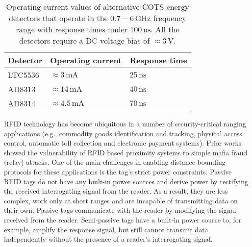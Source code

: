 \documentclass{sig-alternate-10pt}
\newcommand{\eg}{e.g.,\xspace}
\newcommand{\unit}[1]{\ensuremath{\, \mathrm{#1}}}
\begin{document}
\begin{table}
  \centering
  \begin{tabular}[h]{l|l|l}
  \hline
  \textbf{Detector}&\textbf{Operating current}&\textbf{Response time}\\
  \hline
  LTC5536 & $\approx 3\unit{mA}$& $25\unit{ns}$ \\
  AD8313 & $\approx 14\unit{mA}$& $40\unit{ns}$ \\
  AD8314 & $\approx 4.5\unit{mA}$& $70\unit{ns}$ \\
  \hline
  \end{tabular}
  \caption{Operating current values of alternative COTS energy detectors that
    operate in the $0.7-6\unit{GHz}$ frequency range with response times under
    $100\unit{ns}$. All the detectors require a DC voltage bias of $\approx
    3\unit{V}$.} 
  \label{tab:current-ratings-ed}
\end{table}


RFID technology has become ubiquitous in a number of security-critical ranging
applications (\eg commodity goods identification and tracking, physical access
control, automatic toll collection and electronic payment systems). Prior
works~\cite{FrancillonFeb11,FrancisDec10,RolandSep12} showed the vulnerability
of RFID based proximity systems to simple mafia fraud (relay) attacks. One of
the main challenges in enabling distance bounding protocols for these
applications is the tag's strict power constraints. Passive RFID tags do not
have any built-in power sources and derive power by rectifying the received
interrogating signal from the reader. As a result, they are less complex, work
only at short ranges and are incapable of transmitting data on their own.
Passive tags communicate with the reader by modifying the signal received from
the reader. Semi-passive tags have a built-in power source to, for example,
amplify the response signal, but still cannot transmit data independently
without the presence of a reader's interrogating signal.
\end{document}
